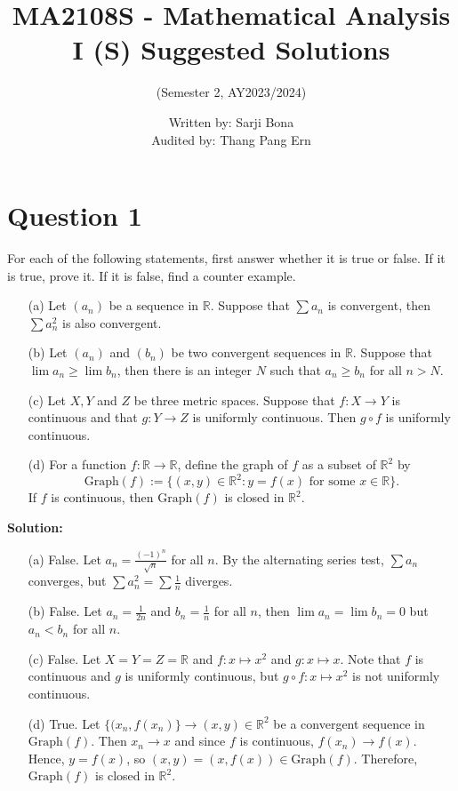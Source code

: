 \documentclass[12pt]{article}
\title{MA2108S - Mathematical Analysis I (S) Suggested Solutions}
\author{(Semester 2, AY2023/2024)}
\date{Written by: Sarji Bona\\Audited by: Thang Pang Ern}
\begin{document}
\maketitle

\section*{Question 1}
For each of the following statements, first answer whether it is true or false. If it is true, prove it. If it is false, find a counter example.
\begin{enumerate}
    \item[(a)] Let $(a_n)$ be a sequence in $\mathbb{R}$. Suppose that $\sum a_n$ is convergent, then $\sum a_n^2$ is also convergent.
    \item[(b)] Let $(a_n)$ and $(b_n)$ be two convergent sequences in $\mathbb{R}$. Suppose that $\lim a_n \ge \lim b_n$, then there is an integer $N$ such that $a_n \ge b_n$ for all $n > N$.
    \item[(c)] Let $X, Y$ and $Z$ be three metric spaces. Suppose that $f : X \to Y$ is continuous and that $g : Y \to Z$ is uniformly continuous. Then $g \circ f$ is uniformly continuous.
    \item[(d)] For a function $f : \mathbb{R} \to \mathbb{R}$, define the graph of $f$ as a subset of $\mathbb{R}^2$ by \[\mathrm{Graph}(f) := \{(x, y) \in \mathbb{R}^2 : y = f(x) \text{ for some } x \in \mathbb{R}\}.\] If $f$ is continuous, then $\mathrm{Graph}(f)$ is closed in $\mathbb{R}^2$.
\end{enumerate}

\noindent \textbf{Solution:} 
\begin{enumerate}
    \item[(a)] False. Let $a_n = \frac{(-1)^n}{\sqrt{n}}$ for all $n$. By the alternating series test, $\sum a_n$ converges, but $\sum a_n^2 = \sum \frac{1}{n}$ diverges.
    \item[(b)] False. Let $a_n = \frac{1}{2n}$ and $b_n = \frac{1}{n}$ for all $n$, then $\lim a_n = \lim b_n = 0$ but $a_n < b_n$ for all $n$.
    \item[(c)] False. Let $X = Y = Z = \mathbb{R}$ and $f : x \mapsto x^2$ and $g : x \mapsto x$. Note that $f$ is continuous and $g$ is uniformly continuous, but $g \circ f : x \mapsto x^2$ is not uniformly continuous.
    \item[(d)] True. Let $\{(x_n, f(x_n)\} \to (x, y) \in \mathbb{R}^2$ be a convergent sequence in $\mathrm{Graph}(f)$. Then $x_n \to x$ and since $f$ is continuous, $f(x_n) \to f(x)$. Hence, $y = f(x)$, so $(x, y) = (x, f(x)) \in \mathrm{Graph}(f)$. Therefore, $\mathrm{Graph}(f)$ is closed in $\mathbb{R}^2$.
\end{enumerate}
\end{document}
